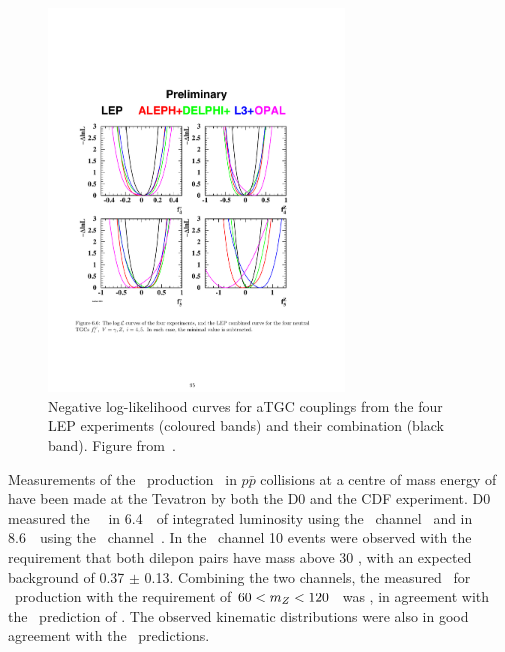 \begin{figure}
\centering
        \includegraphics[width=0.7\textwidth]{lep_tgc}
    \caption[Negative log-likelihood curves for aTGC couplings from the four LEP
    experiments (coloured bands) and their combination (black band).]
    {Negative log-likelihood curves for aTGC couplings from the four LEP
    experiments (coloured bands) and their combination (black band). Figure from~\cite{bib:LEPEW2006}.}
    \label{fig:lep-tgc}
\end{figure}

Measurements of the \ZZ\ production \cx\ in $p \bar{p}$
collisions at a centre of mass energy of  have been made
at the Tevatron by both the D0 and the CDF experiment. D0 measured the \ZZ\ \cx\ in
6.4~\ifb\ of integrated luminosity using the \ZZllll\
channel~\cite{Abazov:2011td} and in 8.6~\ifb\ using the
\ZZllvv\ channel~\cite{Abazov:2012cj}. In the \ZZllll\ channel 10 events
were observed with the requirement that both dilepon pairs have mass above 30
\gev, with an expected background of 0.37 $\pm$ 0.13. Combining the two
channels, the measured \cx\ for \ZZ\ production with the requirement of $60 < m_{Z}
< 120$ \gev\ was 
, 
in agreement with the \sm\ prediction of \crossSec{p\bar p\ra ZZ}{1.3 \pm 0.1 \, \rm{pb}}. 
The observed kinematic distributions were
also in good agreement with the \sm\ predictions. 

